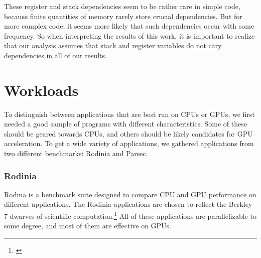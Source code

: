 \documentclass[12pt,twoside]{reedthesis}
\begin{document}
		These register and stack dependencies seem to be rather rare in simple code, because finite quantities of memory rarely store crucial dependencies. But for more complex code, it seems more likely that such dependencies occur with some frequency. So when interpreting the results of this work, it is important to realize that our analysis assumes that stack and register variables do not cary dependencies in all of our results. 
		
%		
%		
%		
%		
		
	\section{Workloads}
		
		To distinguish between applications that are best run on CPUs or GPUs, we first needed a good sample of programs with different characteristics. Some of these should be geared towards CPUs, and others should be likely candidates for GPU acceleration. To get a wide variety of applications, we gathered applications from two different benchmarks: Rodinia and Parsec.
		
		\subsubsection{Rodinia}
		
		Rodina is a benchmark suite designed to compare CPU and GPU performance on different applications. The Rodinia applications are chosen to reflect the Berkley 7 dwarves of scientific computation.\footnote{\cite{Che:2009}} All of these applications are parallelizable to some degree, and most of them are effective on GPUs. 
		
\end{document}
